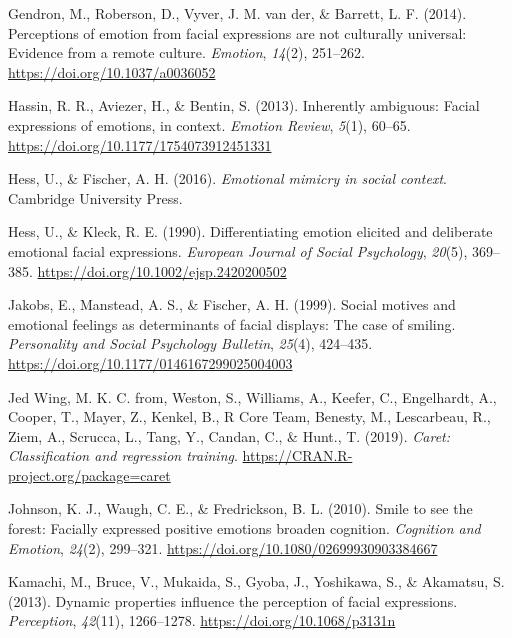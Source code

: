 \documentclass[
  english,
  man]{apa7}
\newlength{\cslhangindent}
\newenvironment{cslreferences}%
  {\setlength{\parindent}{0pt}%
  \everypar{\setlength{\hangindent}{\cslhangindent}}\ignorespaces}%
  {\par}
\begin{document}
\begin{cslreferences}
\leavevmode\hypertarget{ref-gendron2014perceptions}{}%
Gendron, M., Roberson, D., Vyver, J. M. van der, \& Barrett, L. F. (2014). Perceptions of emotion from facial expressions are not culturally universal: Evidence from a remote culture. \emph{Emotion}, \emph{14}(2), 251--262. \url{https://doi.org/10.1037/a0036052}

\leavevmode\hypertarget{ref-hassin2013inherently}{}%
Hassin, R. R., Aviezer, H., \& Bentin, S. (2013). Inherently ambiguous: Facial expressions of emotions, in context. \emph{Emotion Review}, \emph{5}(1), 60--65. \url{https://doi.org/10.1177/1754073912451331}

\leavevmode\hypertarget{ref-hess2016emotional}{}%
Hess, U., \& Fischer, A. H. (2016). \emph{Emotional mimicry in social context}. Cambridge University Press.

\leavevmode\hypertarget{ref-hess1990differentiating}{}%
Hess, U., \& Kleck, R. E. (1990). Differentiating emotion elicited and deliberate emotional facial expressions. \emph{European Journal of Social Psychology}, \emph{20}(5), 369--385. \url{https://doi.org/10.1002/ejsp.2420200502}

\leavevmode\hypertarget{ref-jakobs1999social}{}%
Jakobs, E., Manstead, A. S., \& Fischer, A. H. (1999). Social motives and emotional feelings as determinants of facial displays: The case of smiling. \emph{Personality and Social Psychology Bulletin}, \emph{25}(4), 424--435. \url{https://doi.org/10.1177/0146167299025004003}

\leavevmode\hypertarget{ref-R-caret}{}%
Jed Wing, M. K. C. from, Weston, S., Williams, A., Keefer, C., Engelhardt, A., Cooper, T., Mayer, Z., Kenkel, B., R Core Team, Benesty, M., Lescarbeau, R., Ziem, A., Scrucca, L., Tang, Y., Candan, C., \& Hunt., T. (2019). \emph{Caret: Classification and regression training}. \url{https://CRAN.R-project.org/package=caret}

\leavevmode\hypertarget{ref-johnson2010smile}{}%
Johnson, K. J., Waugh, C. E., \& Fredrickson, B. L. (2010). Smile to see the forest: Facially expressed positive emotions broaden cognition. \emph{Cognition and Emotion}, \emph{24}(2), 299--321. \url{https://doi.org/10.1080/02699930903384667}

\leavevmode\hypertarget{ref-kamachi2013dynamic}{}%
Kamachi, M., Bruce, V., Mukaida, S., Gyoba, J., Yoshikawa, S., \& Akamatsu, S. (2013). Dynamic properties influence the perception of facial expressions. \emph{Perception}, \emph{42}(11), 1266--1278. \url{https://doi.org/10.1068/p3131n}


\end{cslreferences}
\end{document}
